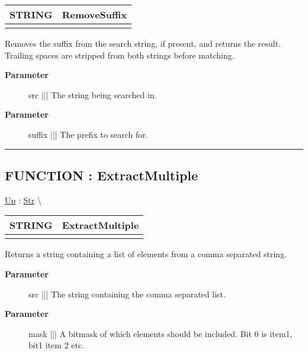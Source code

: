 {\renewcommand{\arraystretch}{1.5}
\begin{tabularx}{\textwidth}{|>{\raggedright\arraybackslash}l|X|}
\hline
\hspace{0pt}STRING & RemoveSuffix \\
\hline
\multicolumn{2}{|>{\raggedright\arraybackslash}X|}{\hspace{0pt}(STRING src, STRING suffix)} \\
\hline
\end{tabularx}
}

\par
Removes the suffix from the search string, if present, and returns the result. Trailing spaces are stripped from both strings before matching.

\par
\begin{description}
\item [\textbf{Parameter}] src ||| The string being searched in.
\item [\textbf{Parameter}] suffix ||| The prefix to search for.
\end{description}

\rule{\linewidth}{0.5pt}
\subsection*{FUNCTION : ExtractMultiple}
\hypertarget{ecldoc:str.extractmultiple}{}
\hyperlink{ecldoc:Str}{Up} :
\hspace{0pt} \hyperlink{ecldoc:Str}{Str} \textbackslash 

{\renewcommand{\arraystretch}{1.5}
\begin{tabularx}{\textwidth}{|>{\raggedright\arraybackslash}l|X|}
\hline
\hspace{0pt}STRING & ExtractMultiple \\
\hline
\multicolumn{2}{|>{\raggedright\arraybackslash}X|}{\hspace{0pt}(STRING src, UNSIGNED8 mask)} \\
\hline
\end{tabularx}
}

\par
Returns a string containing a list of elements from a comma separated string.

\par
\begin{description}
\item [\textbf{Parameter}] src ||| The string containing the comma separated list.
\item [\textbf{Parameter}] mask ||| A bitmask of which elements should be included. Bit 0 is item1, bit1 item 2 etc.
\end{description}

